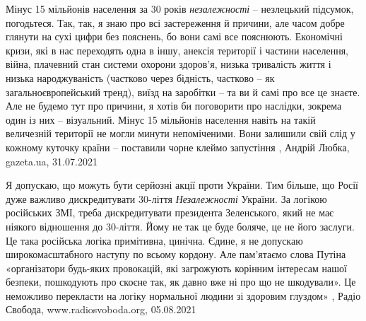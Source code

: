 Мінус 15 мільйонів населення за 30 років \emph{незалежності} – незлецький підсумок,
погодьтеся. Так, так, я знаю про всі застереження й причини, але часом добре
глянути на сухі цифри без пояснень, бо вони самі все пояснюють. Економічні
кризи, які в нас переходять одна в іншу, анексія території і частини населення,
війна, плачевний стан системи охорони здоров'я, низька тривалість життя і
низька народжуваність (частково через бідність, частково – як
загальноєвропейський тренд), виїзд на заробітки – та ви й самі про все це
знаєте.  Але не будемо тут про причини, я хотів би поговорити про наслідки, зокрема один
із них – візуальний. Мінус 15 мільйонів населення навіть на такій величезній
території не могли минути непоміченими. Вони залишили свій слід у кожному
куточку країни – поставили чорне клеймо запустіння
, 
Андрій Любка, gazeta.ua, 31.07.2021

Я допускаю, що можуть бути серйозні акції проти України. Тим більше, що Росії
дуже важливо дискредитувати 30-ліття \emph{Незалежності} України. За логікою
російських ЗМІ, треба дискредитувати президента Зеленського, який не має
ніякого відношення до 30-ліття. Йому не так це буде боляче, це не його заслуги.
Це така російська логіка примітивна, цинічна.  Єдине, я не допускаю
широкомасштабного наступу по всьому кордону. Але пам'ятаємо слова Путіна
«організатори будь-яких провокацій, які загрожують корінним інтересам нашої
безпеки, пошкодують про скоєне так, як давно вже ні про що не шкодували». Це
неможливо перекласти на логіку нормальної людини зі здоровим глуздом»
, 
Радіо Свобода, www.radiosvoboda.org, 05.08.2021

